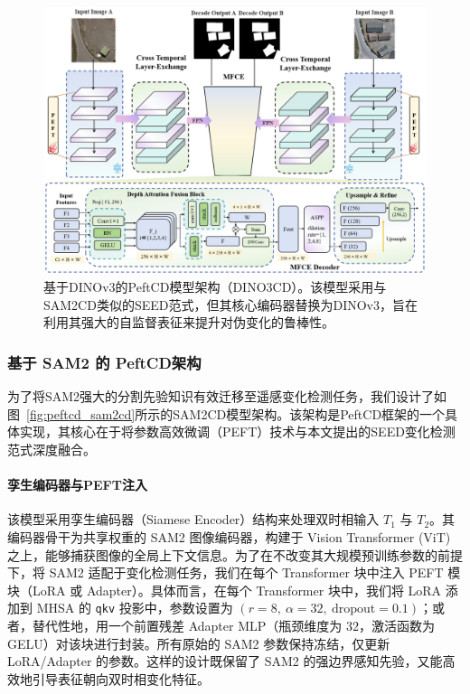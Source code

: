 \begin{figure}[!htb]
  \centering
  \includegraphics[width=\textwidth]{paper_figures/基于AI基础模型微调的变化检测模型研究/PeftCD/peftcd_dino3cd.png} %
  \caption{基于DINOv3的PeftCD模型架构（DINO3CD）。该模型采用与SAM2CD类似的SEED范式，但其核心编码器替换为DINOv3，旨在利用其强大的自监督表征来提升对伪变化的鲁棒性。}
  \label{fig:peftcd_dino3cd}
\end{figure}

\subsubsection{基于 SAM2 的 PeftCD架构}

为了将SAM2强大的分割先验知识有效迁移至遥感变化检测任务，我们设计了如图~\ref{fig:peftcd_sam2cd}所示的SAM2CD模型架构。该架构是PeftCD框架的一个具体实现，其核心在于将参数高效微调（PEFT）技术与本文提出的SEED变化检测范式深度融合。

\paragraph{孪生编码器与PEFT注入}
该模型采用孪生编码器（Siamese Encoder）结构来处理双时相输入 $T_1$ 与 $T_2$。其编码器骨干为共享权重的 SAM2 图像编码器，构建于 Vision Transformer (ViT) 之上，能够捕获图像的全局上下文信息。为了在不改变其大规模预训练参数的前提下，将 SAM2 适配于变化检测任务，我们在每个 Transformer 块中注入 PEFT 模块（LoRA 或 Adapter）。具体而言，在每个 Transformer 块中，我们将 LoRA 添加到 MHSA 的 \texttt{qkv} 投影中，参数设置为 $(r{=}8,\ \alpha{=}32,\ \text{dropout}{=}0.1)$；或者，替代性地，用一个前置残差 Adapter MLP（瓶颈维度为 $32$，激活函数为 GELU）对该块进行封装。所有原始的 SAM2 参数保持冻结，仅更新 LoRA/Adapter 的参数。这样的设计既保留了 SAM2 的强边界感知先验，又能高效地引导表征朝向双时相变化特征。  


